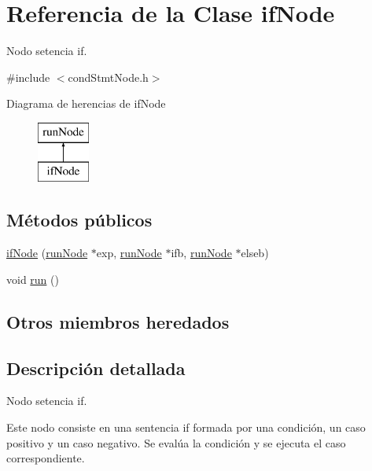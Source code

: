 \hypertarget{classifNode}{\section{Referencia de la Clase if\-Node}
\label{classifNode}
}


Nodo setencia if.  




{\ttfamily \#include $<$cond\-Stmt\-Node.\-h$>$}

Diagrama de herencias de if\-Node\begin{figure}[H]
\begin{center}
\leavevmode
\includegraphics[height=2.000000cm]{classifNode}
\end{center}
\end{figure}
\subsection*{Métodos públicos}
\begin{DoxyCompactItemize}
\item 
\hyperlink{classifNode_a9c0285b9abc0601e11746f6307f5663f}{if\-Node} (\hyperlink{classrunNode}{run\-Node} $\ast$exp, \hyperlink{classrunNode}{run\-Node} $\ast$ifb, \hyperlink{classrunNode}{run\-Node} $\ast$elseb)
\item 
void \hyperlink{classifNode_af136e318ac35eaab32770bebe8c039a1}{run} ()
\end{DoxyCompactItemize}
\subsection*{Otros miembros heredados}


\subsection{Descripción detallada}
Nodo setencia if. 

Este nodo consiste en una sentencia if formada por una condición, un caso positivo y un caso negativo. Se evalúa la condición y se ejecuta el caso correspondiente. 

